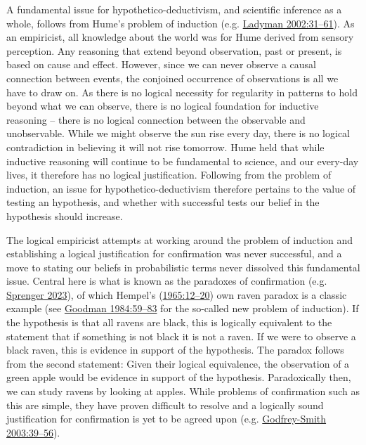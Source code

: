 \documentclass[
  12pt,
  a4paper,
  oneside]{book}
\begin{document}
A fundamental issue for hypothetico-deductivism, and scientific inference as a whole, follows from Hume's problem of induction (e.g. \protect\hyperlink{ref-ladyman2002}{Ladyman 2002:31--61}). As an empiricist, all knowledge about the world was for Hume derived from sensory perception. Any reasoning that extend beyond observation, past or present, is based on cause and effect. However, since we can never observe a causal connection between events, the conjoined occurrence of observations is all we have to draw on. As there is no logical necessity for regularity in patterns to hold beyond what we can observe, there is no logical foundation for inductive reasoning -- there is no logical connection between the observable and unobservable. While we might observe the sun rise every day, there is no logical contradiction in believing it will not rise tomorrow. Hume held that while inductive reasoning will continue to be fundamental to science, and our every-day lives, it therefore has no logical justification. Following from the problem of induction, an issue for hypothetico-deductivism therefore pertains to the value of testing an hypothesis, and whether with successful tests our belief in the hypothesis should increase.

The logical empiricist attempts at working around the problem of induction and establishing a logical justification for confirmation was never successful, and a move to stating our beliefs in probabilistic terms never dissolved this fundamental issue. Central here is what is known as the paradoxes of confirmation (e.g. \protect\hyperlink{ref-sprenger2023}{Sprenger 2023}), of which Hempel's (\protect\hyperlink{ref-hempel1965}{1965:12--20}) own raven paradox is a classic example (see \protect\hyperlink{ref-goodman1983}{Goodman 1984:59--83} for the so-called new problem of induction). If the hypothesis is that all ravens are black, this is logically equivalent to the statement that if something is not black it is not a raven. If we were to observe a black raven, this is evidence in support of the hypothesis. The paradox follows from the second statement: Given their logical equivalence, the observation of a green apple would be evidence in support of the hypothesis. Paradoxically then, we can study ravens by looking at apples. While problems of confirmation such as this are simple, they have proven difficult to resolve and a logically sound justification for confirmation is yet to be agreed upon (e.g. \protect\hyperlink{ref-godfrey-smith2003}{Godfrey-Smith 2003:39--56}).
\end{document}
